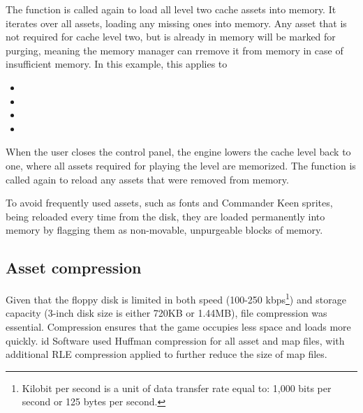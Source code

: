 \documentclass[book.tex]{subfiles}
\begin{document}
\par
The function  is called again to load all level two cache assets into memory. It iterates over all assets, loading any missing ones into memory. Any asset that is not required for cache level two, but is already in memory will be marked for purging, meaning the memory manager can rremove it from memory in case of insufficient memory. In this example, this applies to 
\begin{itemize}
  \item {}
  \item {}
  \item {} 
  \item {}
\end{itemize}



\pagebreak


\par
When the user closes the control panel, the engine lowers the cache level back to one, where all assets required for playing the level are memorized. The function  is called again to reload any assets that were removed from memory.\\

\par

\par
To avoid frequently used assets, such as fonts and Commander Keen sprites, being reloaded every time from the disk, they are loaded permanently into memory by flagging them as non-movable, unpurgeable blocks of memory. \\

\par

\par
 

\subsection{Asset compression}
Given that the floppy disk is limited in both speed (100-250 kbps\footnote{Kilobit per second is a unit of data transfer rate equal to: 1,000 bits per second or 125 bytes per second.}) and storage capacity (3-inch disk size is either 720KB or 1.44MB), file compression was essential. Compression ensures that the game occupies less space and loads more quickly. id Software used Huffman compression for all asset and map files, with additional RLE compression applied to further reduce the size of map files.\\
\end{document}
